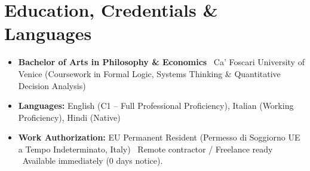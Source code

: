 \documentclass[a4paper,10pt]{article}
\begin{document}
\section{Education, Credentials \& Languages}
\begin{itemize}
  \item \textbf{Bachelor of Arts in Philosophy \& Economics} \textbullet\ Ca' Foscari University of Venice (Coursework in Formal Logic, Systems Thinking \& Quantitative Decision Analysis)
  \item \textbf{Languages:} English (C1 -- Full Professional Proficiency), Italian (Working Proficiency), Hindi (Native)
  \item \textbf{Work Authorization:} EU Permanent Resident (Permesso di Soggiorno UE a Tempo Indeterminato, Italy) \textbullet\ Remote contractor / Freelance ready \textbullet\ Available immediately (0 days notice).
\end{itemize}
\end{document}
